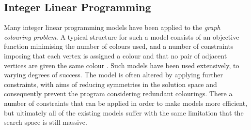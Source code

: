 \documentclass[12pt,a4paper]{article}
\begin{document}
\subsection*{Integer Linear Programming}
\par Many integer linear programming models have been applied to the \textit{graph colouring problem}. A typical structure for such a model consists of an objective function minimising the number of colours used, and a number of constraints imposing that each vertex is assigned a colour and that no pair of adjacent vertices are given the same colour \cite{Toth}. Such models have been used extensively, to varying degrees of success. The model is often altered by applying further constraints, with aims of reducing symmetries in the solution space and consequently prevent the program considering redundant colourings. There a number of constraints that can be applied in order to make models more efficient, but ultimately all of the existing models suffer with the same limitation that the search space is still massive.
\end{document}
